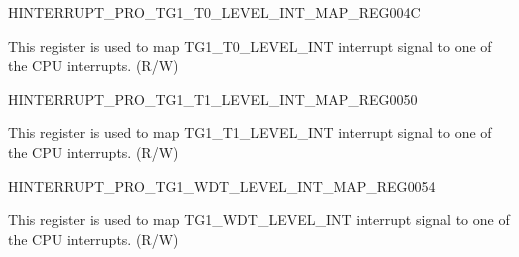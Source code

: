 \begin{register}{H}{INTERRUPT\_PRO\_TG1\_T0\_LEVEL\_INT\_MAP\_REG}{\hexprefix{}004C}\label{regdesc:INTERRUPTPROTG1T0LEVELINTMAPREG}
%
%
\regnewline%
\begin{regdesc}\begin{reglist}
\label{fielddesc:INTERRUPTPROTG1T0LEVELINTMAP}\item [INTERRUPT\_PRO\_TG1\_T0\_LEVEL\_INT\_MAP] This register is used to map TG1\_T0\_LEVEL\_INT interrupt signal to one of the CPU interrupts. (R/W)
\end{reglist}\end{regdesc}
\end{register}


\begin{register}{H}{INTERRUPT\_PRO\_TG1\_T1\_LEVEL\_INT\_MAP\_REG}{\hexprefix{}0050}\label{regdesc:INTERRUPTPROTG1T1LEVELINTMAPREG}
%
%
\regnewline%
\begin{regdesc}\begin{reglist}
\label{fielddesc:INTERRUPTPROTG1T1LEVELINTMAP}\item [INTERRUPT\_PRO\_TG1\_T1\_LEVEL\_INT\_MAP] This register is used to map TG1\_T1\_LEVEL\_INT interrupt signal to one of the CPU interrupts. (R/W)
\end{reglist}\end{regdesc}
\end{register}


\begin{register}{H}{INTERRUPT\_PRO\_TG1\_WDT\_LEVEL\_INT\_MAP\_REG}{\hexprefix{}0054}\label{regdesc:INTERRUPTPROTG1WDTLEVELINTMAPREG}
%
%
\regnewline%
\begin{regdesc}\begin{reglist}
\label{fielddesc:INTERRUPTPROTG1WDTLEVELINTMAP}\item [INTERRUPT\_PRO\_TG1\_WDT\_LEVEL\_INT\_MAP] This register is used to map TG1\_WDT\_LEVEL\_INT interrupt signal to one of the CPU interrupts. (R/W)
\end{reglist}\end{regdesc}
\end{register}


